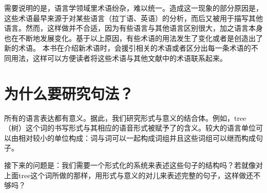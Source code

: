 \largerpage[2]
需要说明的是，语言学领域里术语纷杂，难以统一。造成这一现象的部分原因是，这些术语最早来源于对某些语言（\egc 拉丁语、英语）的分析，而后又被用于描写其他语言。然而，这样做并不合适，因为有些语言与其他语言区别很大，加之语言本身也在不断地发展变化。基于以上原因，有些术语的用法发生了变化或者是创造出了新的术语。
本书在介绍新术语时，会援引相关的术语或者区分出每一条术语的不同用法，这样可以方便读者将这些术语与其他文献中的术语联系起来。

\section{为什么要研究句法？}
\label{sec-wozu-syntax}

所有的语言表达都有意义。据此，我们研究形式与意义的结合体\citep{Saussure16a}\nocite{Saussure16a-Fr}。例如，tree（树）这个词的书写形式与其相应的语音形式被赋予了的含义。较大的语言单位可以由相对较小的单位构成：词与词可以一起构成词组并且这些词组可以继而构成句子。

接下来的问题是：我们需要一个形式化的系统来表述这些句子的结构吗？若就像对上面tree这个词所做的那样，用形式与意义的对儿来表述完整的句子，这样做还不够吗？

